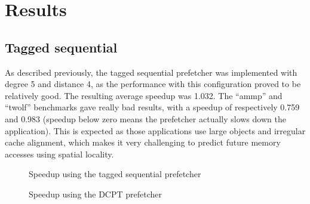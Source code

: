 \section{Results}

\subsection{Tagged sequential}

As described previously, the tagged sequential prefetcher was  implemented with
degree 5 and distance 4, as the performance  with this configuration proved to
be relatively good. The  resulting average speedup was 1.032. The ``ammp'' and
``twolf'' benchmarks gave  really bad results, with a speedup of respectively
0.759 and 0.983  (speedup below zero means the prefetcher actually slows down
the application). This is expected as those applications use large objects and
irregular cache alignment,  which makes it very challenging to predict future
memory accesses using spatial locality.


\begin{figure}[tbp]
\begin{center}
    
    \caption{Speedup using the tagged sequential prefetcher}
    \label{graph:tagged-sequential}
\end{center}
\end{figure}

\begin{figure}[tbp]
\begin{center}
    
    \caption{Speedup using the DCPT prefetcher}
    \label{graph:dcpt}
\end{center}
\end{figure}
